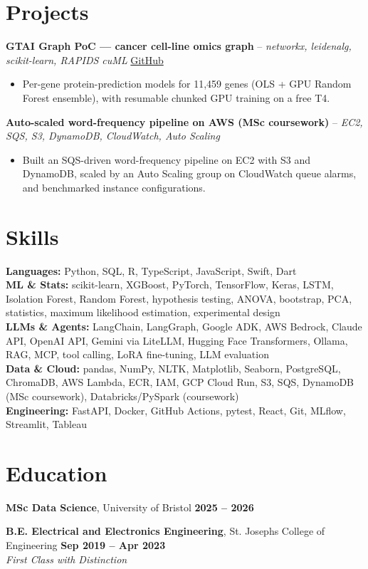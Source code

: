 \documentclass[a4paper,10pt]{article}
\begin{document}
\section{Projects}
\noindent\textbf{GTAI Graph PoC — cancer cell-line omics graph} -- \textit{networkx, leidenalg, scikit-learn, RAPIDS cuML} \hfill \href{https://github.com/Thiruvel-AP/GTAI-GraphPOC}{GitHub}
\begin{itemize}
  \item Per-gene protein-prediction models for 11,459 genes (OLS + GPU Random Forest ensemble), with resumable chunked GPU training on a free T4.
\end{itemize}
\noindent\textbf{Auto-scaled word-frequency pipeline on AWS (MSc coursework)} -- \textit{EC2, SQS, S3, DynamoDB, CloudWatch, Auto Scaling} \hfill 
\begin{itemize}
  \item Built an SQS-driven word-frequency pipeline on EC2 with S3 and DynamoDB, scaled by an Auto Scaling group on CloudWatch queue alarms, and benchmarked instance configurations.
\end{itemize}

\section{Skills}
\textbf{Languages:} Python, SQL, R, TypeScript, JavaScript, Swift, Dart\\
\textbf{ML \& Stats:} scikit-learn, XGBoost, PyTorch, TensorFlow, Keras, LSTM, Isolation Forest, Random Forest, hypothesis testing, ANOVA, bootstrap, PCA, statistics, maximum likelihood estimation, experimental design\\
\textbf{LLMs \& Agents:} LangChain, LangGraph, Google ADK, AWS Bedrock, Claude API, OpenAI API, Gemini via LiteLLM, Hugging Face Transformers, Ollama, RAG, MCP, tool calling, LoRA fine-tuning, LLM evaluation\\
\textbf{Data \& Cloud:} pandas, NumPy, NLTK, Matplotlib, Seaborn, PostgreSQL, ChromaDB, AWS Lambda, ECR, IAM, GCP Cloud Run, S3, SQS, DynamoDB (MSc coursework), Databricks/PySpark (coursework)\\
\textbf{Engineering:} FastAPI, Docker, GitHub Actions, pytest, React, Git, MLflow, Streamlit, Tableau

\section{Education}
\textbf{MSc Data Science}, University of Bristol \hfill \textbf{2025 – 2026}\par
\vspace{2pt}
\textbf{B.E. Electrical and Electronics Engineering}, St. Joseph\textquotesingle{}s College of Engineering \hfill \textbf{Sep 2019 – Apr 2023}\\ \textit{First Class with Distinction}\par
\end{document}
